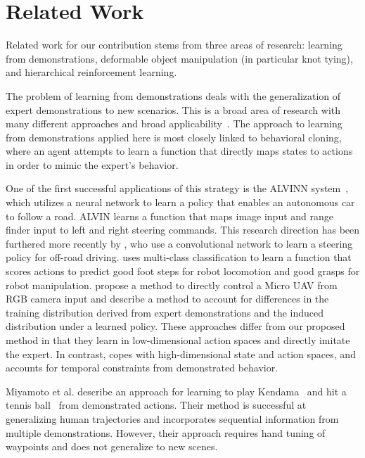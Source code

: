 \section{Related Work}
Related work for our contribution stems from three areas of research:
learning from demonstrations, deformable object manipulation (in particular
knot tying), and hierarchical reinforcement learning.

The problem of learning from demonstrations deals with the generalization of expert demonstrations to new scenarios. 
This is a broad area of research with many different approaches and broad applicability~\cite{Argall_2009, Schaal_1999}.
The approach to learning from demonstrations applied here is most closely linked to behavioral cloning, where an agent attempts to learn a function that directly maps states to actions in order to mimic the expert's behavior. 

One of the first successful applications of this strategy is the ALVINN system~\cite{Pomerleau_NIPS1989}, which utilizes a neural network to learn a policy that enables an autonomous car to follow a road.
ALVIN learns a function that maps image input and range finder input to left and right steering commands. 
This research direction has been furthered more recently by \citet{muller2005off}, who use a convolutional network to learn a steering policy for off-road driving.
\citet{Ratliff_Humanoids2007} uses multi-class classification to learn a function that scores actions to predict good foot steps for robot locomotion and good grasps for robot manipulation.
\citet{Ross_2013} propose a method to directly control a Micro UAV from RGB camera input and describe a method to account for differences in the training distribution derived from expert demonstrations and the induced distribution under a learned policy. 
These approaches differ from our proposed method in that they learn in low-dimensional action spaces and directly imitate the expert.
In contrast, \mmql{} copes with high-dimensional state and action spaces, and accounts for temporal constraints from demonstrated behavior.

Miyamoto et al. describe an approach for learning to play Kendama~\cite{Miyamoto_1996} and hit a tennis ball~\cite{Miyamoto_1998} from demonstrated actions. 
Their method is successful at generalizing human trajectories and incorporates sequential information from multiple demonstrations.
However, their approach requires hand tuning of waypoints and does not generalize to new scenes.

